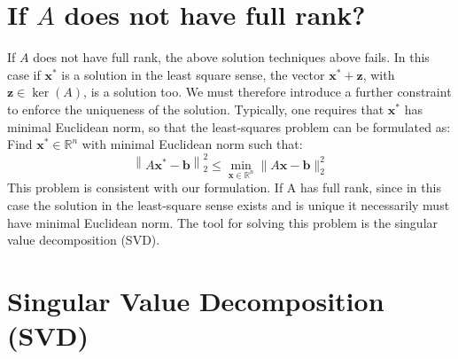 \documentclass[11pt]{book}
\begin{document}
\section*{If $A$ does not have full rank?}
If $A$ does not have full rank, the above solution techniques above fails.
In this case if $\mathbf{x}^{*}$ is a solution in the least square sense, the vector $\mathbf{x}^{*}+\mathbf{z}$, with $\mathbf{z} \in \operatorname{ker}(A)$, is a solution too.
We must therefore introduce a further constraint to enforce the uniqueness of the solution. Typically, one requires that $\mathbf{x}^{*}$ has minimal Euclidean norm, so that the least-squares problem can be formulated as:\\
Find $\mathbf{x}^{*} \in \mathbb{R}^{n}$ with minimal Euclidean norm such that:
$$\left\|A \mathbf{x}^{*}-\mathbf{b}\right\|_{2}^{2} \leq \min _{\mathbf{x} \in \mathbb{R}^{n}}\|A \mathbf{x}-\mathbf{b}\|_{2}^{2}$$
This problem is consistent with our formulation. If A has full rank, since in this case the solution in the least-square sense exists and is unique it necessarily must have minimal Euclidean norm.
The tool for solving this problem is the singular value decomposition (SVD).

\section*{Singular Value Decomposition (SVD)}
  
\end{document}
